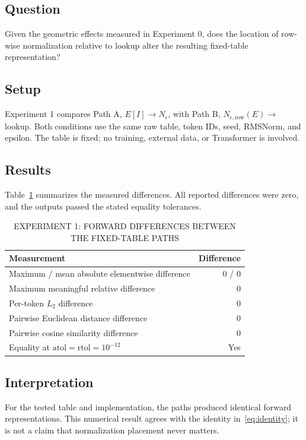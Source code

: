 \documentclass[conference]{IEEEtran}
\begin{document}
\subsection{Question}
Given the geometric effects measured in Experiment 0, does the location of row-wise normalization relative to lookup alter the resulting fixed-table representation?

\subsection{Setup}
Experiment 1 compares Path A, \(E[I]\rightarrow N_{\epsilon}\), with Path B, \(N_{\epsilon,\mathrm{row}}(E)\rightarrow\) lookup. Both conditions use the same raw table, token IDs, seed, RMSNorm, and epsilon. The table is fixed; no training, external data, or Transformer is involved.

\subsection{Results}
Table~\ref{tab:exp1} summarizes the measured differences. All reported differences were zero, and the outputs passed the stated equality tolerances.

\begin{table}[t]
\caption{EXPERIMENT 1: FORWARD DIFFERENCES BETWEEN THE FIXED-TABLE PATHS}
\label{tab:exp1}
\centering
\footnotesize
\setlength{\tabcolsep}{3pt}
\begin{tabular}{p{}r}
\toprule
Measurement & Difference\\
\midrule
Maximum / mean absolute elementwise difference & 0 / 0\\
Maximum meaningful relative difference & 0\\
Per-token \(L_2\) difference & 0\\
Pairwise Euclidean distance difference & 0\\
Pairwise cosine similarity difference & 0\\
Equality at \(\mathrm{atol}=\mathrm{rtol}=10^{-12}\) & Yes\\
\bottomrule
\end{tabular}
\end{table}

\subsection{Interpretation}
For the tested table and implementation, the paths produced identical forward representations. This numerical result agrees with the identity in~\eqref{eq:identity}; it is not a claim that normalization placement never matters.
\end{document}
